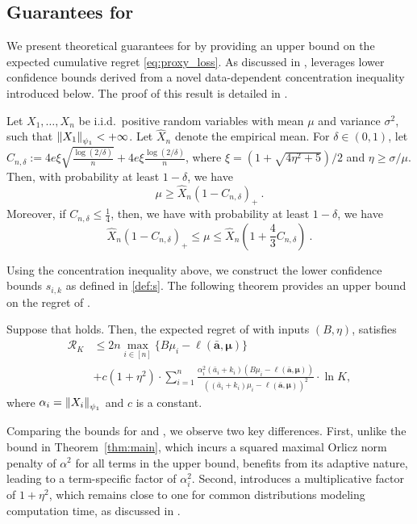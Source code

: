\subsection{Guarantees for }

We present theoretical guarantees for  by providing an upper bound on the expected cumulative regret \eqref{eq:proxy_loss}. As discussed in ,  leverages lower confidence bounds derived from a novel data-dependent concentration inequality introduced below. The proof of this result is detailed in .
\begin{lemma}\label{lem:0}
	Let $X_1, \dots, X_n$ be i.i.d.\ positive random variables with mean $\mu$ and variance $\sigma^2$, such that $\left\| X_1 \right\|_ {\psi_1}<+\infty$. Let $\hat{X}_n$ denote the empirical mean. For $\delta \in (0,1)$, let
	$
		C_{n,\delta} := 4e\xi \sqrt{\frac{\log(2/\delta)}{n}}+4e\xi \frac{\log(2/\delta)}{n}
	$,
	where $\xi = (1+\sqrt{4\eta^2+5})/2$ and $\eta \ge \sigma/\mu$. Then, with probability at least $1-\delta$, we have
	$$
		\mu \ge \hat{X}_n \left(1- C_{n,\delta}\right)_{+}~.
	$$
	Moreover, if $C_{n,\delta} \le \frac{1}{4}$, then, we have with probability at least $1-\delta$, we have
	$$
		\hat{X}_n \left(1- C_{n,\delta}\right)_{+} \le \mu \le \hat{X}_n \left(1+\frac{4}{3}C_{n,\delta}\right)~.
	$$
\end{lemma}
 
Using the concentration inequality above, we construct the lower confidence bounds $\hat{s}_{i,k}$ as defined in \eqref{def:s}. The following theorem provides an upper bound on the regret of .

\begin{theorem}
	\label{thm:main2}
	Suppose that  holds.
	Then, the expected regret of  with inputs $(B, \eta)$, satisfies
	\begin{align*}
		\mathcal{R}_K &\le 2n\max_{i \in [n]} \{B\mu_i -\ell(\bar{\bm{a}}, \bm{\mu})\}\\
		& +c (1+\eta^2)\cdot\sum \limits_{i=1}^{n} \frac{\alpha_i^2(\bar{a}_i+k_i)(B \mu_i - \ell(\bar{\bm{a}}, \bm{\mu})) }{\left((\bar{a}_i+k_i)\mu_i - \ell(\bar{\bm{a}}, \bm{\mu})\right)^2}\cdot \ln K,
	\end{align*}
	where $\alpha_i =  \left\| X_i \right\|_{\psi_1}$ and $c$ is a constant.
\end{theorem}

Comparing the bounds for  and , we observe two key differences. First, unlike the bound in Theorem~\ref{thm:main}, which incurs a squared maximal Orlicz norm penalty of $\alpha^2$ for all terms in the upper bound,  benefits from its adaptive nature, leading to a term-specific factor of $\alpha_i^2$. Second,  introduces a multiplicative factor of $1+\eta^2$, which remains close to one for common distributions modeling computation time, as discussed in .







